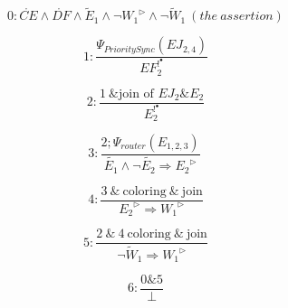 $$0: \mathring{CE} \wedge \mathring{DF} \wedge \tilde{E}_1 \wedge \neg {W_1}^\triangleright \wedge \neg \tilde{W}_1 \ (the\ assertion)$$

$$1:\frac{\Psi_{PrioritySync}(EJ_{2,4}) }{EF_2^{!^\bullet} } $$ %

$$2:\frac{1\ \& \text{join of } EJ_2 \& E_2}{E_2^{!^\bullet}}$$ %

$$3:\frac{2; \Psi_{router}(E_{1,2,3}) }{\tilde{E_1} \wedge \neg 
\tilde{E_2} \Rightarrow {E_2}^\triangleright} \ $$

$$4:\frac{3\ \&\ \text{coloring}\ \&\ \text{join}}{ {E_2}^\triangleright \Rightarrow {W_1}^\triangleright}$$ 

$$5:\frac{2\ \&\ 4\ \text{coloring}\ \&\ \text{join}}{\neg \tilde{W}_1\Rightarrow {W_1}^\triangleright} $$

$$6:\frac{0 \& 5}{\bot}$$

